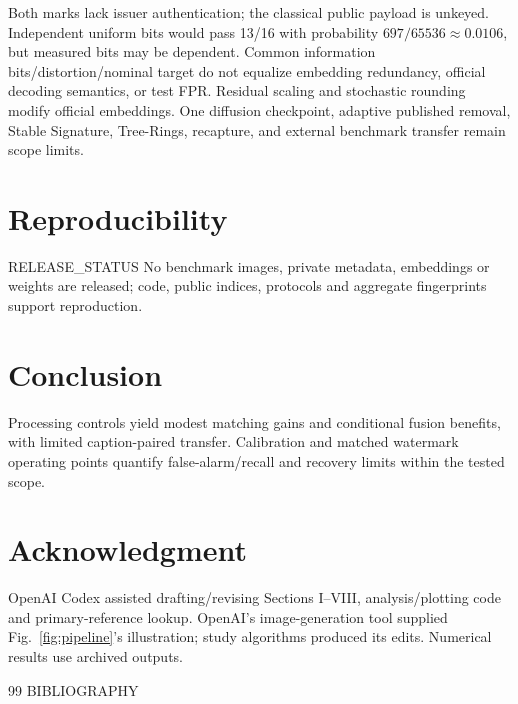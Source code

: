 \documentclass[conference]{IEEEtran}
\begin{document}
Both marks lack issuer authentication; the classical public payload is
unkeyed. Independent uniform bits would pass 13/16 with probability
$697/65536\approx0.0106$, but measured bits may be dependent.
Common information bits/distortion/nominal target do not equalize embedding
redundancy, official decoding semantics, or test FPR. Residual scaling and
stochastic rounding modify official embeddings. One diffusion checkpoint,
adaptive published removal, Stable Signature, Tree-Rings, recapture, and
external benchmark transfer remain scope limits.

\section{Reproducibility}
{{RELEASE_STATUS}}
No benchmark images, private metadata, embeddings or weights are released;
code, public indices, protocols and aggregate fingerprints support reproduction.

\section{Conclusion}
Processing controls yield modest matching gains and conditional fusion
benefits, with limited caption-paired transfer. Calibration and matched
watermark operating points quantify false-alarm/recall and recovery limits
within the tested scope.
\balance
\section*{Acknowledgment}
OpenAI Codex assisted drafting/revising Sections I--VIII, analysis/plotting
code and primary-reference lookup. OpenAI's image-generation
tool supplied Fig.~\ref{fig:pipeline}'s illustration; study algorithms
produced its edits. Numerical results use archived outputs.
\begin{thebibliography}{99}
{{BIBLIOGRAPHY}}
\end{thebibliography}
\end{document}
